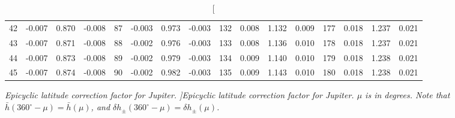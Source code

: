 \begin{table}
{\begin{tabular}{rrrr|rrrr|rrrr|crrr}
 42 & \tiny{ -0.007} &   0.870 & \tiny{ -0.008} &  87 & \tiny{ -0.003} &   0.973 & \tiny{ -0.003} & 132 & \tiny{  0.008} &   1.132 & \tiny{  0.009} & 177 & \tiny{  0.018} &   1.237 & \tiny{  0.021}\\
 43 & \tiny{ -0.007} &   0.871 & \tiny{ -0.008} &  88 & \tiny{ -0.002} &   0.976 & \tiny{ -0.003} & 133 & \tiny{  0.008} &   1.136 & \tiny{  0.010} & 178 & \tiny{  0.018} &   1.237 & \tiny{  0.021}\\
 44 & \tiny{ -0.007} &   0.873 & \tiny{ -0.008} &  89 & \tiny{ -0.002} &   0.979 & \tiny{ -0.003} & 134 & \tiny{  0.009} &   1.140 & \tiny{  0.010} & 179 & \tiny{  0.018} &   1.238 & \tiny{  0.021}\\
 45 & \tiny{ -0.007} &   0.874 & \tiny{ -0.008} &  90 & \tiny{ -0.002} &   0.982 & \tiny{ -0.003} & 135 & \tiny{  0.009} &   1.143 & \tiny{  0.010} & 180 & \tiny{  0.018} &   1.238 & \tiny{  0.021}\\
 \end{tabular}}
\caption[\em  Epicyclic latitude correction factor for Jupiter. ]{\em Epicyclic latitude correction factor for Jupiter. $\mu$ is in degrees. Note that $\bar{h}(360^\circ-\mu) = \bar{h}(\mu)$, and $\delta h_{\pm}(360^\circ-\mu) = \delta h_{\pm}(\mu)$. }\label{tlat2j}
\end{table}

